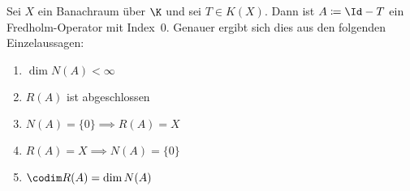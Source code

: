 \begin{thSatz} \label{vl21:satz8.16}
    Sei $X$ ein Banachraum über $\K$ und sei $T\in K(X)$.
    Dann ist $A\defeq\Id-T$ ein Fredholm-Operator mit Index~$0$.
    Genauer ergibt sich dies aus den folgenden Einzelaussagen:
    \begin{enumerate}[(1),leftmargin=1.8cm,labelsep=1.5em]
        \item \label{vl21:satz8.16:1}
            $\dim N(A) < \infty$
            
        \item \label{vl21:satz8.16:2}
            $R(A)$ ist abgeschlossen
            
        \item \label{vl21:satz8.16:3}
            $N(A)=\{0\} \implies R(A) = X$
            
        \item \label{vl21:satz8.16:4}
            $R(A) = X \implies N(A) = \{0\}$
            
        \item \label{vl21:satz8.16:5}
            $\codim R(A) = \dim N(A)$
    \end{enumerate}
\end{thSatz}

